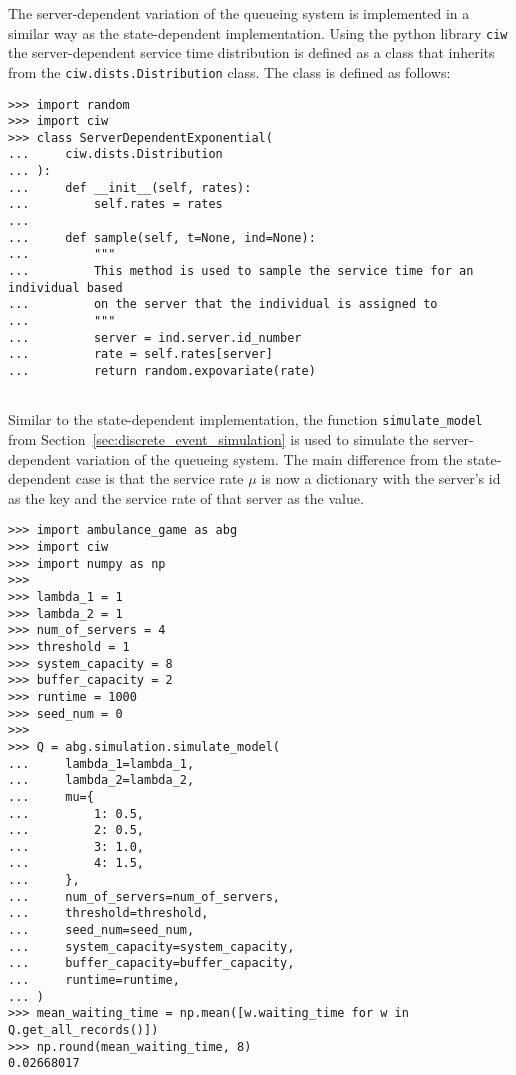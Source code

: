 The server-dependent variation of the queueing system is implemented in a
similar way as the state-dependent implementation.
Using the python library \texttt{ciw} the server-dependent service time
distribution is defined as a class that inherits from the
\texttt{ciw.dists.Distribution} class.
The class is defined as follows:

\begin{lstlisting}[style=pystyle]
>>> import random
>>> import ciw
>>> class ServerDependentExponential(
...     ciw.dists.Distribution
... ):
...     def __init__(self, rates):
...         self.rates = rates
... 
...     def sample(self, t=None, ind=None):
...         """
...         This method is used to sample the service time for an individual based
...         on the server that the individual is assigned to
...         """
...         server = ind.server.id_number
...         rate = self.rates[server]
...         return random.expovariate(rate)
    
\end{lstlisting}

Similar to the state-dependent implementation, the function
\texttt{simulate\_model} from Section~\ref{sec:discrete_event_simulation} is
used to simulate the server-dependent variation of the queueing system.
The main difference from the state-dependent case is that the service rate
\(\mu\) is now a dictionary with the server's id as the key and the service
rate of that server as the value.

\begin{lstlisting}[style=pystyle]
>>> import ambulance_game as abg
>>> import ciw
>>> import numpy as np
>>>
>>> lambda_1 = 1
>>> lambda_2 = 1
>>> num_of_servers = 4
>>> threshold = 1
>>> system_capacity = 8
>>> buffer_capacity = 2
>>> runtime = 1000
>>> seed_num = 0
>>>
>>> Q = abg.simulation.simulate_model(
...     lambda_1=lambda_1,
...     lambda_2=lambda_2,
...     mu={
...         1: 0.5,
...         2: 0.5,
...         3: 1.0,
...         4: 1.5,
...     },
...     num_of_servers=num_of_servers,
...     threshold=threshold,
...     seed_num=seed_num,
...     system_capacity=system_capacity,
...     buffer_capacity=buffer_capacity,
...     runtime=runtime,
... )
>>> mean_waiting_time = np.mean([w.waiting_time for w in Q.get_all_records()])
>>> np.round(mean_waiting_time, 8)
0.02668017

\end{lstlisting}

